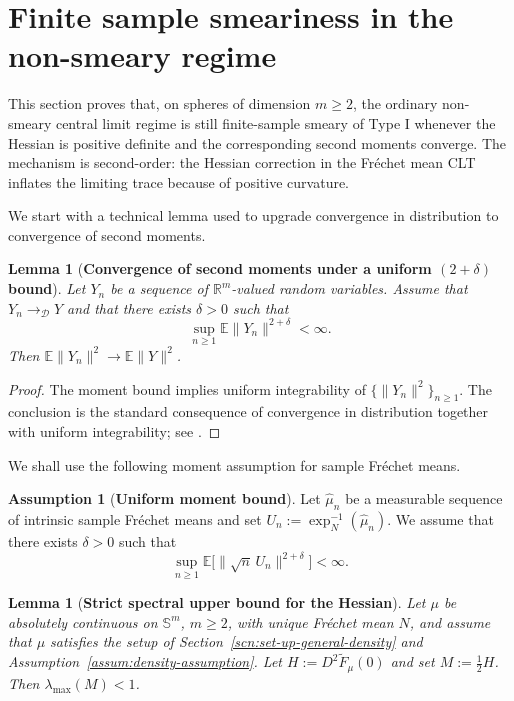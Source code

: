 \documentclass{amsart}
\newtheorem{lemma}[theorem]{Lemma}
\theoremstyle{definition}
\newtheorem{assumption}[theorem]{Assumption}
\theoremstyle{remark}
\newcommand\0{\boldsymbol{0}}
\begin{document}
\section{Finite sample smeariness in the non-smeary regime}
\label{scn:FSS}

This section proves that, on spheres of dimension \(m\ge2\), the ordinary non-smeary central limit regime is still finite-sample smeary of Type I whenever the Hessian is positive definite and the corresponding second moments converge.  The mechanism is second-order: the Hessian correction in the Fr\'echet mean CLT inflates the limiting trace because of positive curvature.

We start with a technical lemma used to upgrade convergence in distribution to convergence of second moments.

\begin{lemma}[\textbf{Convergence of second moments under a uniform \((2+\delta)\) bound}]
\label{lem:L2_from_CLT}
Let \(Y_n\) be a sequence of \(\mathbb R^m\)-valued random variables.  Assume that \(Y_n\rightarrow_{\mathcal D}Y\) and that there exists \(\delta>0\) such that
\[
    \sup_{n\ge1}\mathbb E\|Y_n\|^{2+\delta}<\infty .
\]
Then \(\mathbb E\|Y_n\|^2\to \mathbb E\|Y\|^2\).
\end{lemma}

\begin{proof}
The moment bound implies uniform integrability of \(\{\|Y_n\|^2\}_{n\ge1}\).  The conclusion is the standard consequence of convergence in distribution together with uniform integrability; see \citet{Billingsley1999}.
\end{proof}

We shall use the following moment assumption for sample Fr\'echet means.

\begin{assumption}[\textbf{Uniform moment bound}]
\label{assump:momnt-bound}
Let \(\widehat\mu_n\) be a measurable sequence of intrinsic sample Fr\'echet means and set \(U_n:=\exp_N^{-1}(\widehat\mu_n)\).  We assume that there exists \(\delta>0\) such that
\[
    \sup_{n\ge1}\mathbb E\bigl[\|\sqrt n\,U_n\|^{2+\delta}\bigr]<\infty .
\]
\end{assumption}

\begin{lemma}[\textbf{Strict spectral upper bound for the Hessian}]
\label{lem:spectral_bound_Hess}
Let \(\mu\) be absolutely continuous on \(\mathbb S^m\), \(m\ge2\), with unique Fr\'echet mean \(N\), and assume that \(\mu\) satisfies the setup of Section~\ref{scn:set-up-general-density} and Assumption~\ref{assum:density-assumption}.  Let \(H:=D^2\widetilde F_\mu(0)\) and set \(M:=\frac12 H\).  Then \(\lambda_{\max}(M)<1\).
\end{lemma}
\end{document}
